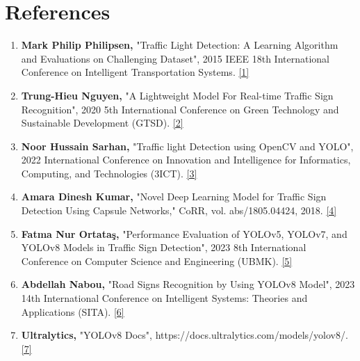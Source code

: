 \documentclass[12 pt]{report}
\begin{document}
\section*{References}

\begin{enumerate}
    \item \textbf{Mark Philip Philipsen,} "Traffic Light Detection: A Learning Algorithm and Evaluations on Challenging Dataset", 2015 IEEE 18th International Conference on Intelligent Transportation Systems.
    \href{https://doi.org/10.1109/ITSC.2015.378}{[1]}

    \item \textbf{Trung-Hieu Nguyen,} "A Lightweight Model For Real-time Traffic Sign Recognition", 2020 5th International Conference on Green Technology and Sustainable Development (GTSD).
    \href{https://doi.org/10.1109/GTSD50082.2020.9303072}{[2]}

    \item \textbf{Noor Hussain Sarhan,} "Traffic light Detection using OpenCV and YOLO", 2022 International Conference on Innovation and Intelligence for Informatics, Computing, and Technologies (3ICT).
    \href{https://doi.org/10.1109/3ICT56508.2022.9990723}{[3]}

    \item \textbf{Amara Dinesh Kumar,} "Novel Deep Learning Model for Traffic Sign Detection Using Capsule Networks," CoRR, vol. abs/1805.04424, 2018.
    \href{https://doi.org/10.48550/arXiv.1805.04424}{[4]}

    \item \textbf{Fatma Nur Ortataş,} "Performance Evaluation of YOLOv5, YOLOv7, and YOLOv8 Models in Traffic Sign Detection", 2023 8th International Conference on Computer Science and Engineering (UBMK).
    \href{https://doi.org/10.1109/UBMK59864.2023.10286611}{[5]}

    \item \textbf{Abdellah Nabou,} "Road Signs Recognition by Using YOLOv8 Model", 2023 14th International Conference on Intelligent Systems: Theories and Applications (SITA).
    \href{https://ieeexplore.ieee.org/document/10373723}{[6]}

    \item \textbf{Ultralytics,} "YOLOv8 Docs", https://docs.ultralytics.com/models/yolov8/.
    \href{https://www.ros.org/}{[7]}

\end{enumerate}
\end{document}
